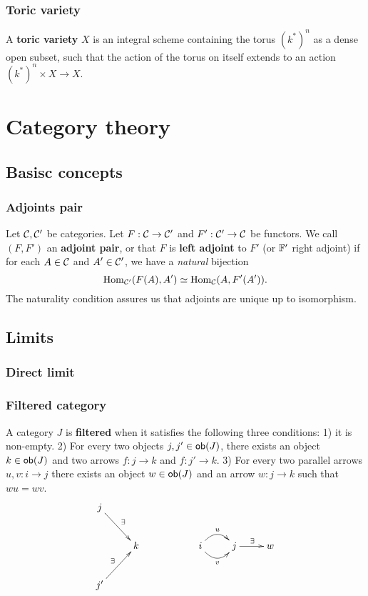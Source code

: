 \documentclass[11pt, english]{article}
\begin{document}
\subsubsection{Toric variety}
\label{toricvariety}

A \textbf{toric variety} $X$ is an integral scheme containing the torus $(k^\ast)^n$ as a dense open subset, such that the action of the torus on itself extends to an action $(k^\ast)^n \times X \to X$.


\section{Category theory}
\subsection{Basisc concepts}

\subsubsection{Adjoints pair}
\label{adjoint}

Let $\mathcal{C},\mathcal{C}'$ be categories. Let $F:\mathcal{C} \to \mathcal{C}'$ and $F':\mathcal{C}' \to \mathcal{C}$ be functors. We call $(F,F')$ an \textbf{adjoint pair}, or that $F$ is \textbf{left adjoint} to $F'$ (or $\mathbb{F}'$ right adjoint) if for each $A \in \mathcal{C}$ and $A' \in \mathcal{C}'$, we have a \emph{natural} bijection
\[
\operatorname{Hom}_{\mathcal{C}'}(F(A),A') \simeq \operatorname{Hom}_{\mathcal{C}}(A,F'(A')).
\]
The naturality condition assures us that adjoints are unique up to isomorphism. 

\subsection{Limits}

\subsubsection{Direct limit}
\label{directlimit}



\subsubsection{Filtered category}
\label{filteredcategory}
A category $J$ is \textbf{filtered} when it satisfies the following three conditions: 1) it is non-empty. 2) For every two objects $j,j' \in \mathsf{ob}(J)$, there exists an object $k \in \mathsf{ob}(J)$ and two arrows $f:j \to k$ and $f:j' \to k$. 3) For every two parallel arrows $u,v:i \to j$ there exists an object $w \in \mathsf{ob}(J)$ and an arrow $w:j \to k$ such that $wu=wv$.
\[
\xymatrix{
j \ar[dr]^\exists  &  & \\
  &  k &  & i \ar@/^{1pc}/[r]^u \ar@/_{1pc}/[r]_v  & j \ar[r]^\exists &  w \\ 
j' \ar[ur]^\exists  &
}
\]
\end{document}
